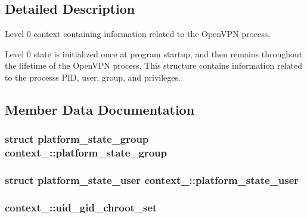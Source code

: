 \subsection{Detailed Description}
Level 0 context containing information related to the Open\+V\+P\+N process.

Level 0 state is initialized once at program startup, and then remains throughout the lifetime of the Open\+V\+P\+N process. This structure contains information related to the process\textquotesingle{}s P\+I\+D, user, group, and privileges. 

\subsection{Member Data Documentation}
\hypertarget{structcontext__0_a2b214a974983a9c9f74e3c80dc1f0161}{}
\subsubsection[{platform\+\_\+state\+\_\+group}]{\setlength{\rightskip}{0pt plus 5cm}struct {\bf platform\+\_\+state\+\_\+group} context\+\_\+::platform\+\_\+state\+\_\+group}\label{structcontext__0_a2b214a974983a9c9f74e3c80dc1f0161}
\hypertarget{structcontext__0_a663b5e3cf38a4fc003b34fed87e9555c}{}
\subsubsection[{platform\+\_\+state\+\_\+user}]{\setlength{\rightskip}{0pt plus 5cm}struct {\bf platform\+\_\+state\+\_\+user} context\+\_\+::platform\+\_\+state\+\_\+user}\label{structcontext__0_a663b5e3cf38a4fc003b34fed87e9555c}
\hypertarget{structcontext__0_adf83164d54c6c56957e5550a45b63338}{}
\subsubsection[{uid\+\_\+gid\+\_\+chroot\+\_\+set}]{ context\+\_\+::uid\+\_\+gid\+\_\+chroot\+\_\+set}\label{structcontext__0_adf83164d54c6c56957e5550a45b63338}
\hypertarget{structcontext__0_af599a649761ec7fd83b5aa3dab4a502e}{}
